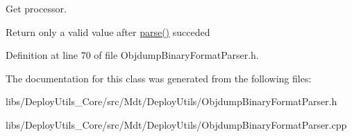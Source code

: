 Get processor. 

Return only a valid value after \hyperlink{class_mdt_1_1_deploy_utils_1_1_objdump_binary_format_parser_a83e87522f42004c12d61301bbc0f1b3d}{parse()} succeded 

Definition at line 70 of file Objdump\+Binary\+Format\+Parser.\+h.



The documentation for this class was generated from the following files\+:\begin{DoxyCompactItemize}
\item 
libs/\+Deploy\+Utils\+\_\+\+Core/src/\+Mdt/\+Deploy\+Utils/Objdump\+Binary\+Format\+Parser.\+h\item 
libs/\+Deploy\+Utils\+\_\+\+Core/src/\+Mdt/\+Deploy\+Utils/Objdump\+Binary\+Format\+Parser.\+cpp\end{DoxyCompactItemize}
